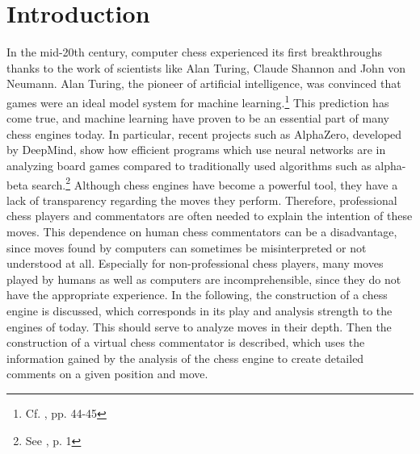 \section{Introduction}

In the mid-20th century, computer chess experienced its first breakthroughs thanks to the work of scientists like Alan Turing, Claude Shannon and John von Neumann. Alan Turing, the pioneer of artificial intelligence, was convinced that games were an ideal model system for machine learning.\footnote{Cf. \cite{levy-newborn-1982}, pp. 44-45} This prediction has come true, and machine learning have proven to be an essential part of many chess engines today. In particular, recent projects such as AlphaZero, developed by DeepMind, show how efficient programs which use neural networks are in analyzing board games compared to traditionally used algorithms such as alpha-beta search.\footnote{See \cite{alphazero-2018}, p. 1} Although chess engines have become a powerful tool, they have a lack of transparency regarding the moves they perform. Therefore, professional chess players and commentators are often needed to explain the intention of these moves. This dependence on human chess commentators can be a disadvantage, since moves found by computers can sometimes be misinterpreted or not understood at all. Especially for non-professional chess players, many moves played by humans as well as computers are incomprehensible, since they do not have the appropriate experience. In the following, the construction of a chess engine is discussed, which corresponds in its play and analysis strength to the engines of today. This should serve to analyze moves in their depth. Then the construction of a virtual chess commentator is described, which uses the information gained by the analysis of the chess engine to create detailed comments on a given position and move.